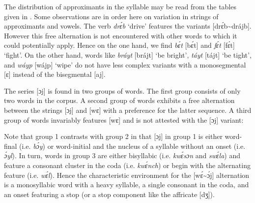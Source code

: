 The distribution of approximants in the syllable may be read from the tables given in . Some observations are in order here on variation in strings of approximants and vowels. The verb \textit{drɛ́b} ‘drive’ features the variants [drɛ́b{\textasciitilde}drájb]. However this free alternation is not encountered with other words to which it could potentially apply. Hence on the one hand, we find \textit{bɛ́t} [bɛ́t] and \textit{fɛ́t} [fɛ́t] ‘fight’. On the other hand, words like \textit{bráyt} [brájt] ‘be bright’, \textit{táyt} [tájt] ‘be tight’, and \textit{wáyp} [wájp] ‘wipe’ do not have less complex variants with a monosegmental [ɛ] instead of the bisegmental [aj]. 



The series [ɔj] is found in two groups of words. The first group consists of only two words in the corpus. A second group of words exhibits a free alternation between the strings [ɔj] and [wɛ] with a preference for the latter sequence. A third group of words invariably features [wɛ] and is not attested with the [ɔj] variant:

Note that group 1 contrasts with group 2 in that [ɔj] in group 1 is either word-final (i.e. \textit{bɔ́y}) or word-initial and the nucleus of a syllable without an onset (i.e. \textit{ɔ́yl}). In turn, words in group 3 are either bisyllabic (i.e. \textit{kwɛ́sɔn} and \textit{swɛ́la}) and feature a consonant cluster{\fff} in the coda (i.e. \textit{kwɛ́nch}) or begin with the alternating feature (i.e. \textit{wɛ́l}). Hence the characteristic environment for the [wɛ́{\textasciitilde}ɔ́j] alternation is a monosyllabic word with a heavy syllable, a single consonant in the coda, and an onset featuring a stop (or a stop component like the affricate [dʒ]). 

